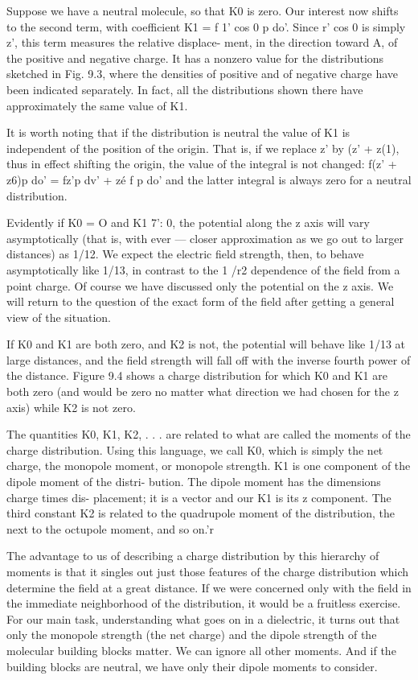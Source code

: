 {Suppose we have a neutral molecule, so that K0 is zero. Our interest
now shifts to the second term, with coefficient K1 = f 1' cos 0 p do'.
Since r' cos 0 is simply z', this term measures the relative displace-
ment, in the direction toward A, of the positive and negative charge.
It has a nonzero value for the distributions sketched in Fig. 9.3, where
the densities of positive and of negative charge have been indicated
separately. In fact, all the distributions shown there have approximately
the same value of K1.

It is worth noting that if the distribution is neutral the value of K1
is independent of the position of the origin. That is, if we replace
z' by (z' + z(1), thus in effect shifting the origin, the value of the integral
is not changed: f(z' + z6)p do' = fz'p dv' + zé f p do' and the
latter integral is always zero for a neutral distribution.

Evidently if K0 = O and K1 7': 0, the potential along the z axis will
vary asymptotically (that is, with ever --- closer approximation as we
go out to larger distances) as 1/12. We expect the electric field
strength, then, to behave asymptotically like 1/13, in contrast to the
1 /r2 dependence of the field from a point charge. Of course we have
discussed only the potential on the z axis. We will return to the question
of the exact form of the field after getting a general view of the
situation.

 

If K0 and K1 are both zero, and K2 is not, the potential will behave
like 1/13 at large distances, and the field strength will fall off with
the inverse fourth power of the distance. Figure 9.4 shows a charge
distribution for which K0 and K1 are both zero (and would be zero
no matter what direction we had chosen for the z axis) while K2 is
not zero.

The quantities K0, K1, K2, . . . are related to what are called the
moments of the charge distribution. Using this language, we call K0,
which is simply the net charge, the monopole moment, or monopole
strength. K1 is one component of the dipole moment of the distri-
bution. The dipole moment has the dimensions charge times dis-
placement; it is a vector and our K1 is its z component. The third
constant K2 is related to the quadrupole moment of the distribution,
the next to the octupole moment, and so on.'r

The advantage to us of describing a charge distribution by this
hierarchy of moments is that it singles out just those features of the
charge distribution which determine the field at a great distance. If
we were concerned only with the field in the immediate neighborhood
of the distribution, it would be a fruitless exercise. For our main task,
understanding what goes on in a dielectric, it turns out that only the
monopole strength (the net charge) and the dipole strength of the
molecular building blocks matter. We can ignore all other moments.
And if the building blocks are neutral, we have only their dipole
moments to consider.

}
